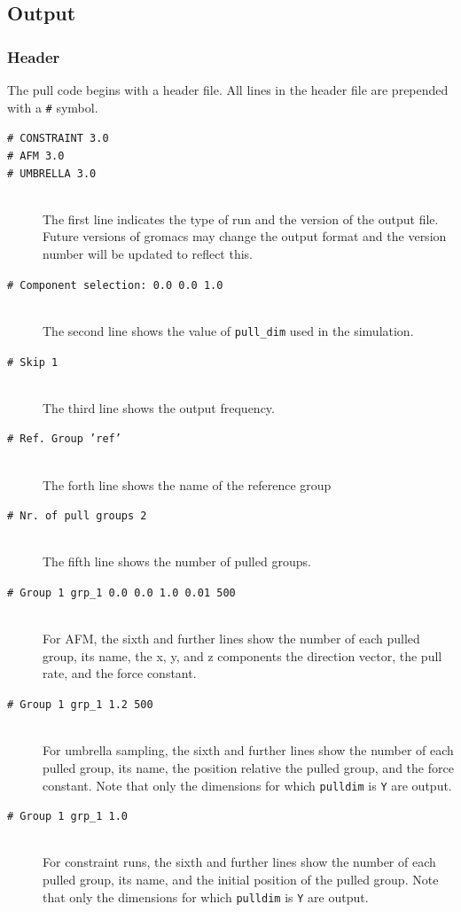 \subsection{Output}
\subsubsection{Header}
The pull code begins with a header file. All lines in the header file are
prepended with a {\tt \#} symbol.

\begin{description}
\item[\tt \# CONSTRAINT     3.0]
\item[\tt \# AFM            3.0]
\item[\tt \# UMBRELLA       3.0]\mbox{}\\
The first line indicates the type of run and the version of the output file. Future
versions of gromacs may change the output format and the version number will
be updated to reflect this.

\item[\tt \# Component selection: 0.0 0.0 1.0 ]\mbox{}\\
The second line shows the value of {\tt pull\_dim} used
in the simulation.

\item[\tt \# Skip 1]\mbox{}\\
The third line shows the output frequency.

\item[\tt \# Ref. Group 'ref']\mbox{}\\
The forth line shows the name of the reference group

\item[\tt \# Nr. of pull groups 2]\mbox{}\\
The fifth line shows the number of pulled groups.

\item[\tt \# Group 1 grp\_1 0.0 0.0 1.0 0.01 500] \mbox{}\\
For AFM, the sixth and further lines show the number of each pulled 
group, its name, the x, y, and z components the direction vector, the pull rate, and
the force constant.

\item[\tt \# Group 1 grp\_1 1.2 500]\mbox{}\\
For umbrella sampling, the sixth and further lines show the number of
each pulled group, its name, the position relative the pulled group, and
the force constant. Note that only the dimensions for which {\tt pulldim}
is {\tt Y} are output.

\item[\tt \# Group 1 grp\_1 1.0]\mbox{}\\
For constraint runs, the sixth and further lines show the number of
each pulled group, its name, and the initial position of the pulled
group. Note that only the dimensions for which {\tt pulldim}
is {\tt Y} are output.
\end{description}

